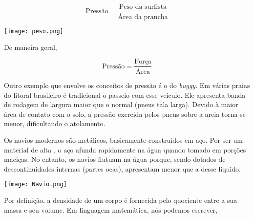 \documentclass[book, 12pt, twoside, a5paper, english, brazil, sumario=tradicional, openany]{abntex2}
\begin{document}
\vspace{-0.2cm}

\begin{equation}
    \text{Pressão} = \dfrac{\text{Peso da surfista}}{\text{Área da prancha}}
\end{equation}

\begin{center}
    \texttt{[image: peso.png]} 
\end{center}
\vspace{-0.13cm}

De maneira geral, 

\vspace{-0.2cm}

\begin{equation}
    \text{Pressão} = \dfrac{\text{Força}}{\text{Área}}
\end{equation}

Outro exemplo que envolve os conceitos de pressão é o do \textit{buggy}. Em várias praias do litoral brasileiro é tradicional o passeio com esse veículo. Ele apresenta banda de rodagem de largura maior que o normal (pneus tala larga). Devido à maior área de contato com o solo, a pressão exercida pelos pneus sobre a areia torna-se menor, dificultando o atolamento.

\vspace{-0.44cm}

{}

\vspace{-0.3cm}

Os navios modernos são metálicos, basicamente construídos em aço. Por ser um material de alta {\color{celestialblue}{densidade}}, o aço afunda rapidamente na água quando tomado em porções maciças. No entanto, os navios flutuam na água porque, sendo dotados de descontinuidades internas (partes ocas), apresentam {\color{celestialblue}{densidade}} menor que a desse líquido.

\vspace{0.5cm}
\begin{center}
    \texttt{[image: Navio.png]} 
\end{center}
\vspace{-0.13cm}

Por definição, a densidade de um corpo é fornecida pelo quociente entre a sua massa e seu volume. Em linguagem matemática, nós podemos escrever, 
\end{document}

